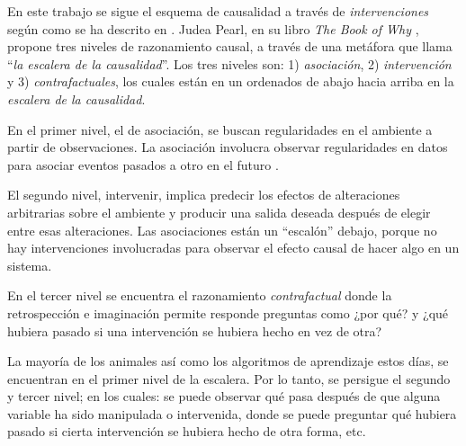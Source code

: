 En este trabajo se sigue el esquema de causalidad  
a través de \textit{intervenciones} según como se ha descrito en \cite{woodward2005making, spirtes2000causation, pearl_2009}.
Judea Pearl, en su libro \textit{The Book of Why} \cite{pearl2018bookofwhy}, propone tres niveles
de razonamiento causal, a través de una metáfora que llama ``\textit{la escalera de la causalidad}''.
Los tres niveles son: 1) \textit{asociación}, 2) \textit{intervención} y 3) \textit{contrafactuales}, los cuales están en un ordenados de abajo hacia arriba en la \textit{escalera de la causalidad}.

En el primer nivel, el de asociación, se buscan regularidades
en el ambiente a partir de observaciones. La asociación 
involucra observar regularidades en datos para 
asociar eventos pasados a otro en el futuro \cite{kathpalia2019measuring}.




El segundo nivel, intervenir, implica predecir los 
efectos de alteraciones arbitrarias sobre el ambiente
y producir una salida deseada después de elegir entre esas alteraciones. Las asociaciones
están un ``escalón'' debajo, porque
no hay
intervenciones involucradas para observar el efecto
causal de hacer algo en un sistema.

En el tercer nivel se encuentra
el razonamiento \textit{contrafactual} donde la retrospección
e imaginación permite responde preguntas como ¿por qué?
y ¿qué hubiera pasado si una intervención se hubiera hecho 
en vez de otra?

La mayoría de los animales así como los algoritmos
de aprendizaje estos días, se encuentran en el primer 
nivel de la escalera. Por lo
tanto, se persigue el segundo y tercer nivel;
en los cuales: se puede observar qué pasa después de que alguna variable ha sido manipulada o intervenida, donde se puede preguntar qué hubiera pasado si cierta intervención se hubiera hecho de otra forma, etc.


